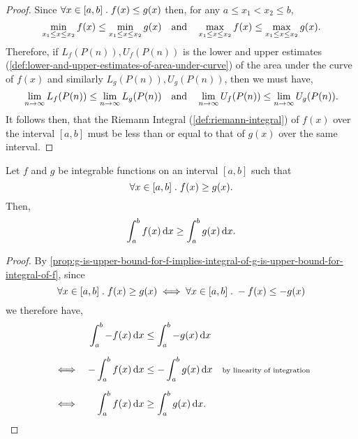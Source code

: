 \documentclass[../MathsNotesBase.tex]{subfiles}
\begin{document}
{		\bigskip
		\begin{proof}\nl[4]
			Since ${ \forall x \in [a,b] \;.\; f(x) \leq g(x) }$ then, for any ${ a \leq x_1 < x_2 \leq b }$,
			\[ \min_{ x_1 \leq x \leq x_2 } f(x) \leq \min_{ x_1 \leq x \leq x_2 } g(x) \hspace{10pt}\text{and}\hspace{10pt} \max_{ x_1 \leq x \leq x_2 } f(x) \leq \max_{ x_1 \leq x \leq x_2 } g(x). \]
			Therefore, if ${ L_f(P(n)), U_f(P(n)) }$ is the lower and upper estimates (\ref{def:lower-and-upper-estimates-of-area-under-curve}) of the area under the curve of $f(x)$ and similarly ${ L_g(P(n)), U_g(P(n)) }$, then we must have,
			\[ \lim_{n \to \infty} L_f(P(n)) \leq \lim_{n \to \infty} L_g(P(n)) \hspace{10pt}\text{and}\hspace{10pt} \lim_{n \to \infty} U_f(P(n)) \leq \lim_{n \to \infty} U_g(P(n)). \]
			It follows then, that the Riemann Integral (\ref{def:riemann-integral}) of $f(x)$ over the interval $[a,b]$ must be less than or equal to that of $g(x)$ over the same interval.
		\end{proof}
		\smallskip
		\begin{corollary}\label{coro:g-is-lower-bound-for-f-implies-integral-of-g-is-lower-bound-for-integral-of-f}
			Let $f$ and $g$ be integrable functions on an interval $[a,b]$ such that
				\[ \forall x \in [a,b] \;.\; f(x) \geq g(x). \]
			Then,
				\[ \int_a^b f(x) \dif x \geq \int_a^b g(x) \dif x. \]
		\end{corollary}
		\begin{proof}\nl[4]
			By \autoref{prop:g-is-upper-bound-for-f-implies-integral-of-g-is-upper-bound-for-integral-of-f}, since
			\[ \forall x \in [a,b] \;.\; f(x) \geq g(x) \iff \forall x \in [a,b] \;.\; -f(x) \leq -g(x) \]
			we therefore have,
			\[\begin{aligned}
				&&\int_a^b -f(x) \dif x &\leq \int_a^b -g(x) \dif x \nn
				&\iff & -\int_a^b f(x) \dif x &\leq -\int_a^b g(x) \dif x &\sidecomment{by linearity of integration} \nn
				&\iff & \int_a^b f(x) \dif x &\geq \int_a^b g(x) \dif x. \qedhere
			\end{aligned}\]
		\end{proof}
		
}
\end{document}
